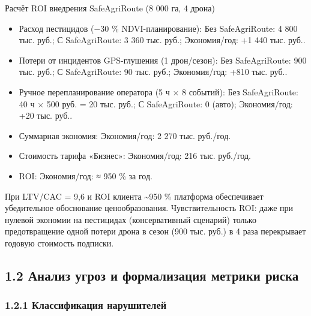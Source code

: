 \documentclass[14pt,a4paper]{extarticle}
\begin{document}
Расчёт ROI внедрения SafeAgriRoute (8 000 га, 4 дрона)
\begin{itemize}
\item Расход пестицидов (−30 \% NDVI-планирование): Без SafeAgriRoute: 4 800 тыс. руб.; С SafeAgriRoute: 3 360 тыс. руб.; Экономия/год: +1 440 тыс. руб..
\item Потери от инцидентов GPS-глушения (1 дрон/сезон): Без SafeAgriRoute: 900 тыс. руб.; С SafeAgriRoute: 90 тыс. руб.; Экономия/год: +810 тыс. руб..
\item Ручное перепланирование оператора (5 ч × 8 событий): Без SafeAgriRoute: 40 ч × 500 руб. = 20 тыс. руб.; С SafeAgriRoute: 0 (авто); Экономия/год: +20 тыс. руб..
\item Суммарная экономия: Экономия/год: 2 270 тыс. руб./год.
\item Стоимость тарифа «Бизнес»: Экономия/год: 216 тыс. руб./год.
\item ROI: Экономия/год: ≈ 950 \% за год.
\end{itemize}


При LTV/CAC = 9,6 и ROI клиента \textasciitilde950 \% платформа обеспечивает убедительное обоснование ценообразования. Чувствительность ROI: даже при нулевой экономии на пестицидах (консервативный сценарий) только предотвращение одной потери дрона в сезон (900 тыс. руб.) в 4 раза перекрывает годовую стоимость подписки.


\hypertarget{ux430ux43dux430ux43bux438ux437-ux443ux433ux440ux43eux437-ux438-ux444ux43eux440ux43cux430ux43bux438ux437ux430ux446ux438ux44f-ux43cux435ux442ux440ux438ux43aux438-ux440ux438ux441ux43aux430}{%
\subsection{1.2 Анализ угроз и формализация метрики риска}\label{ux430ux43dux430ux43bux438ux437-ux443ux433ux440ux43eux437-ux438-ux444ux43eux440ux43cux430ux43bux438ux437ux430ux446ux438ux44f-ux43cux435ux442ux440ux438ux43aux438-ux440ux438ux441ux43aux430}}

\hypertarget{ux43aux43bux430ux441ux441ux438ux444ux438ux43aux430ux446ux438ux44f-ux43dux430ux440ux443ux448ux438ux442ux435ux43bux435ux439}{%
\subsubsection{1.2.1 Классификация нарушителей}\label{ux43aux43bux430ux441ux441ux438ux444ux438ux43aux430ux446ux438ux44f-ux43dux430ux440ux443ux448ux438ux442ux435ux43bux435ux439}}
\end{document}
